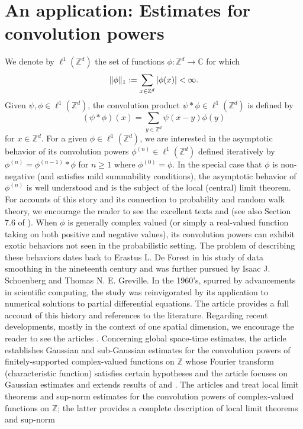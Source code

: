 \documentclass[11pt]{article}
\theoremstyle{remark}
\begin{document}
\section{An application: Estimates for convolution powers}\label{sec:ConvolutionPowers}

We denote by $\ell^1(\mathbb{Z}^d)$ the set of functions $\phi:\mathbb{Z}^d\to\mathbb{C}$ for which
\begin{equation*}
\|\phi\|_1:=\sum_{x\in\mathbb{Z}^d}\abs{\phi(x)}<\infty.
\end{equation*}
Given $\psi,\phi\in \ell^1(\mathbb{Z}^d)$, the convolution product $\psi\ast\phi\in\ell^1(\mathbb{Z}^d)$ is defined by
\begin{equation*}
\left(\psi\ast\phi\right)(x)=\sum_{y\in\mathbb{Z}^d}\psi(x-y)\phi(y)
\end{equation*}
for $x\in\mathbb{Z}^d$. For a given $\phi\in\ell^1(\mathbb{Z}^d)$, we are interested in the asymptotic behavior of its convolution powers $\phi^{(n)}\in\ell^1(\mathbb{Z}^d)$ defined iteratively by $\phi^{(n)}=\phi^{(n-1)}\ast\phi$ for $n\geq 1$ where $\phi^{(0)}=\phi$. In the special case that $\phi$ is non-negative (and satisfies mild summability conditions), the asymptotic behavior of $\phi^{(n)}$ is well understood and is the subject of the local (central) limit theorem. For accounts of this story and its connection to probability and random walk theory, we encourage the reader to see the excellent texts \cite{lawler_random_2010} and \cite{spitzer_principles_1964} (see also Section 7.6 of \cite{randles_convolution_2017}). When $\phi$ is generally complex valued (or simply a real-valued function taking on both positive and negative values), its convolution powers can exhibit exotic behaviors not seen in the probabilistic setting. The problem of describing these behaviors dates back to Erastus L. De Forest in his study of data smoothing in the nineteenth century and was further pursued by Isaac J. Schoenberg and Thomas N. E.  Greville. In the 1960's, spurred by advancements in scientific computing, the study was reinvigorated by its application to numerical solutions to partial differential equations. The article \cite{diaconis_convolution_2014} provides a full account of this history and references to the literature. Regarding recent developments, mostly in the context of one spatial dimension, we encourage the reader to see the articles \cite{diaconis_convolution_2014,randles_convolution_2015, coulombel2020generalized, randles_convolution_2017}. Concerning global space-time estimates, the article \cite{diaconis_convolution_2014} establishes Gaussian and sub-Gaussian estimates for the convolution powers of finitely-supported complex-valued functions on $\mathbb{Z}$ whose Fourier transform (characteristic function) satisfies certain hypotheses and the article \cite{coulombel2020generalized} focuses on Gaussian estimates and extends results of \cite{diaconis_convolution_2014} and \cite{randles_convolution_2017}. The articles \cite{diaconis_convolution_2014} and \cite{randles_convolution_2015} treat local limit theorems and sup-norm estimates for the convolution powers of complex-valued functions on $\mathbb{Z}$; the latter provides a complete description of local limit theorems and sup-norm 
\end{document}
